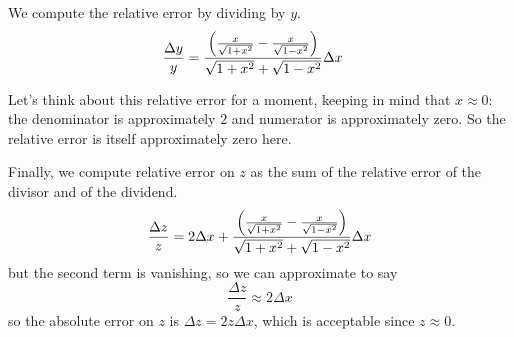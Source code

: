 \documentclass[11pt,letterpaper]{article}
\begin{document}
\begin{enumerate}
\begin{enumerate}
        We compute the relative error by dividing by $y$.
        \begin{align*}
          \frac{\Delta y}{y}
          &= \frac{
            \left(\frac{x}{\sqrt{1 + x^2}} - \frac{x}{\sqrt{1 - x^2}}\right)
          }{
            \sqrt{1 + x^2} + \sqrt{1 - x^2}
          }
          \Delta x
        \end{align*}

        Let's think about this relative error for a moment, keeping in mind
        that $x \approx 0$:
        the denominator is approximately $2$ and numerator is approximately
        zero.
        So the relative error is itself approximately zero here.

        Finally, we compute relative error on $z$ as the sum of the relative
        error of the divisor and of the dividend.
        \begin{equation*}
          \frac{\Delta z}{z}
          =
          2 \Delta x
          +
          \frac{
            \left(\frac{x}{\sqrt{1 + x^2}} - \frac{x}{\sqrt{1 - x^2}}\right)
          }{
            \sqrt{1 + x^2} + \sqrt{1 - x^2}
          }
          \Delta x
        \end{equation*}
        but the second term is vanishing, so we can approximate to say
        \begin{equation*}
          \frac{\Delta z}{z}
          \approx 2\Delta x
        \end{equation*}
        so the absolute error on $z$ is $\Delta z = 2 z \Delta x$, which is
        acceptable since $z \approx 0$.
    \end{enumerate}
\end{enumerate}
\end{document}
